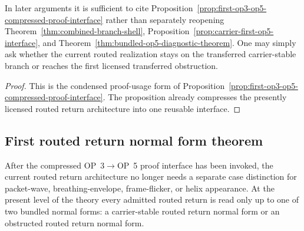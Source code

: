 \begin{corollary}
\label{cor:compressed-routed-return-through-bundled-transfer}
In later arguments it is sufficient to cite Proposition~\ref{prop:first-op3-op5-compressed-proof-interface} rather than separately reopening Theorem~\ref{thm:combined-branch-shell}, Proposition~\ref{prop:carrier-first-op5-interface}, and Theorem~\ref{thm:bundled-op5-diagnostic-theorem}. One may simply ask whether the current routed realization stays on the transferred carrier-stable branch or reaches the first licensed transferred obstruction.
\end{corollary}

\begin{proof}
This is the condensed proof-usage form of Proposition~\ref{prop:first-op3-op5-compressed-proof-interface}. The proposition already compresses the presently licensed routed return architecture into one reusable interface.
\end{proof}


\subsection{First routed return normal form theorem}
\label{sec:first-routed-return-normal-form-theorem}

\begin{remark}
After the compressed OP~3$\to$OP~5 proof interface has been invoked, the current routed return architecture no longer needs a separate case distinction for packet-wave, breathing-envelope, frame-flicker, or helix appearance. At the present level of the theory every admitted routed return is read only up to one of two bundled normal forms: a carrier-stable routed return normal form or an obstructed routed return normal form.
\end{remark}

